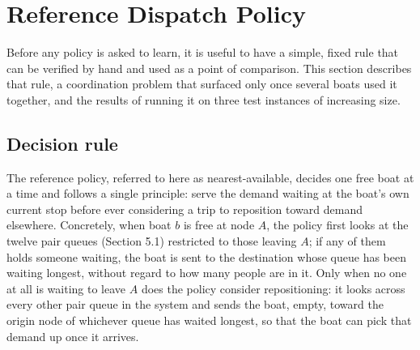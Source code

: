 \documentclass[11pt,a4paper]{article}
\begin{document}
\section{Reference Dispatch Policy}
\label{sec:politica-base}

Before any policy is asked to learn, it is useful to have a simple, fixed rule that can be verified by hand and used as a point of comparison. This section describes that rule, a coordination problem that surfaced only once several boats used it together, and the results of running it on three test instances of increasing size.

\subsection{Decision rule}

The reference policy, referred to here as nearest-available, decides one free boat at a time and follows a single principle: serve the demand waiting at the boat's own current stop before ever considering a trip to reposition toward demand elsewhere. Concretely, when boat $b$ is free at node $A$, the policy first looks at the twelve pair queues (Section 5.1) restricted to those leaving $A$; if any of them holds someone waiting, the boat is sent to the destination whose queue has been waiting longest, without regard to how many people are in it. Only when no one at all is waiting to leave $A$ does the policy consider repositioning: it looks across every other pair queue in the system and sends the boat, empty, toward the origin node of whichever queue has waited longest, so that the boat can pick that demand up once it arrives.
\end{document}
